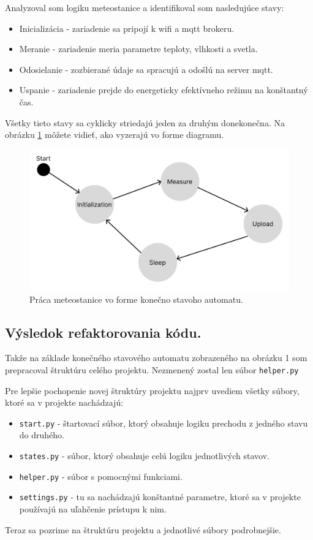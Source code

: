 Analyzoval som logiku meteostanice a identifikoval som nasledujúce stavy:
\begin{itemize}
    \item Inicializácia - zariadenie sa pripojí k wifi a \gls{mqtt} brokeru.
    \item Meranie - zariadenie meria parametre teploty, vlhkosti a svetla.
    \item Odosielanie - zozbierané údaje sa spracujú a odošlú na server \gls{mqtt}.
    \item Uspanie - zariadenie prejde do energeticky efektívneho režimu na konštantný čas.
\end{itemize}
Všetky tieto stavy sa cyklicky striedajú jeden za druhým donekonečna. Na obrázku \ref{ksa} môžete vidieť, ako vyzerajú vo forme diagramu.
\begin{figure}[!ht]
    \centering
    \includegraphics[width=\textwidth]{figures/KSA}
    \caption{Práca meteostanice vo forme konečno stavoho automatu. \label{ksa}}
\end{figure}

\subsection{Výsledok refaktorovania kódu.}
Takže na základe konečného stavového automatu zobrazeného na obrázku 1 som prepracoval štruktúru celého projektu. Nezmenený zostal len súbor \verb|helper.py|

Pre lepšie pochopenie novej štruktúry projektu najprv uvediem všetky súbory, ktoré sa v projekte nachádzajú: 
\begin{itemize}
    \item \verb|start.py| - štartovací súbor, ktorý obsahuje logiku prechodu z jedného stavu do druhého.
    \item \verb|states.py| - súbor, ktorý obsahuje celú logiku jednotlivých stavov.
    \item \verb|helper.py| - súbor s pomocnými funkciami.
    \item \verb|settings.py| - tu sa nachádzajú konštantné parametre, ktoré sa v projekte používajú na uľahčenie prístupu k nim.
\end{itemize}
Teraz sa pozrime na štruktúru projektu a jednotlivé súbory podrobnejšie.

